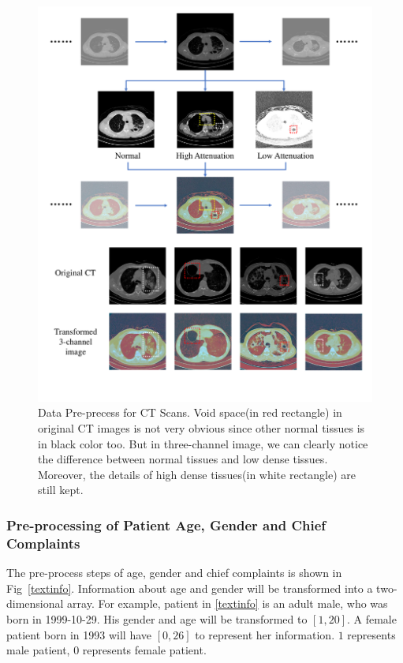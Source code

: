 \documentclass[journal]{IEEEtran}
\begin{document}
\begin{figure}[!t]
    \centerline{\includegraphics[width=150mm]{3channel.pdf}}
    \vspace{-1cm}
    \caption{Data Pre-precess for CT Scans. Void space(in red rectangle) in original CT images is not very obvious since other normal tissues is in black color too. But in three-channel image, we can clearly notice the difference between normal tissues and low dense tissues. Moreover, the details of high dense tissues(in white rectangle) are still kept. }
    \vspace{-0cm}
    \label{3channel}
    \end{figure}

\subsubsection{Pre-processing of Patient Age, Gender and Chief Complaints}
\label{textdata}
The pre-process steps of age, gender and chief complaints is shown in Fig~\ref{textinfo}. 
Information about age and gender will be transformed into a two-dimensional array. For example, patient in \ref{textinfo} is an adult male, who was born in 1999-10-29. His gender and age will be transformed to $[1, 20]$. A female patient born in 1993 will have $[0, 26]$ to represent her information. $1$ represents male patient, $0$ represents female patient. 
\end{document}
